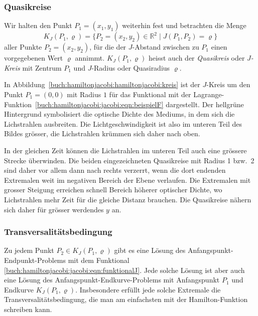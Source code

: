 %
%
\subsubsection{Quasikreise}
Wir halten den Punkt $P_1=(x_1,y_1)$ weiterhin fest und betrachten die
Menge
\[
K_J(P_1,\varrho)
=
\{
P_2=(x_2,y_2)\in\mathbb{R}^2
\mid
J(P_1,P_2) = \varrho
\}
\]
aller Punkte $P_2=(x_2,y_2)$, für die der $J$-Abstand zwischen
zu $P_1$ einen vorgegebenen Wert $\varrho$ annimmt.
$K_J(P_1,\varrho)$ heisst auch der {\em Quasikreis} oder {\em $J$-Kreis}
%
%
mit Zentrum $P_1$ und $J$-Radius oder Quasiradius $\varrho$.
%
%

\begin{beispiel}
In Abbildung~\ref{buch:hamiltonjacobi:hamiltonjacobi:kreis} ist der
$J$-Kreis um den Punkt $P_1=(0,0)$ mit Radius $1$ für das Funktional
mit der Lagrange-Funktion~\eqref{buch:hamiltonjacobi:jacobi:eqn:beispielF}
dargestellt.
Der hellgrüne Hintergrund symbolisiert die optische Dichte des Mediums,
in dem sich die Lichstrahlen ausbreiten.
%
Die Lichtgeschwindigkeit ist also im unteren Teil des Bildes grösser,
die Lichstrahlen krümmen sich daher nach oben.

In der gleichen Zeit können die Lichstrahlen im unteren Teil auch
eine grössere Strecke überwinden.
Die beiden eingezeichneten Quasikreise mit Radius 1 bzw.~2 sind 
daher vor allem dann nach rechts verzerrt, wenn die dort
endenden Extremalen weit im negativen Bereich der Ebene verlaufen.
Die Extremalen mit grosser Steigung erreichen schnell Bereich höherer
optischer Dichte, wo Lichstrahlen mehr Zeit für die gleiche Distanz
brauchen.
Die Quasikreise nähern sich daher für grösser werdendes $y$ an.
\end{beispiel}

%
%
\subsubsection{Transversalitätsbedingung}
Zu jedem Punkt $P_2\in K_J(P_1,\varrho)$ gibt es eine Lösung des
Anfangspunkt-Endpunkt-Problems mit dem Funktional
\eqref{buch:hamiltonjacobi:jacobi:eqn:funktionalJ}.
Jede solche Lösung ist aber auch eine Lösung des
Anfangspunkt-Endkurve-Problems mit Anfangspunkt $P_1$ und
Endkurve $K_J(P_1,\varrho)$.
Insbesondere erfüllt jede solche Extremale die Transversalitätsbedingung,
die man am einfachsten mit der Hamilton-Funktion schreiben kann.


